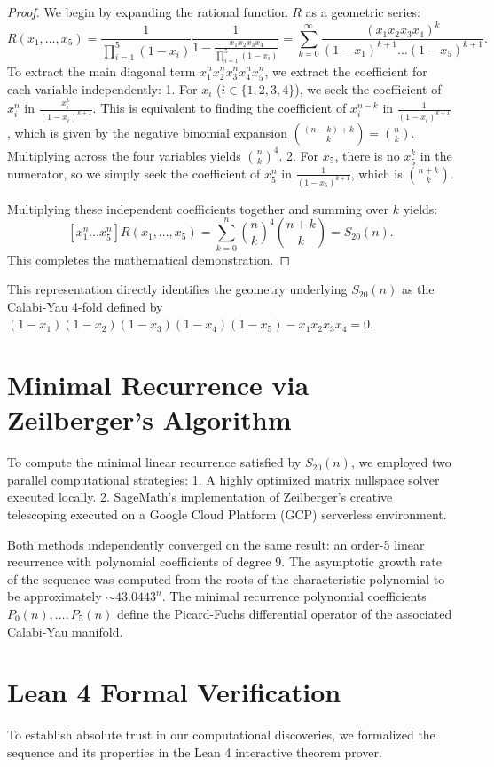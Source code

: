 \documentclass[11pt, a4paper]{article}
\begin{document}
\begin{proof}
We begin by expanding the rational function $R$ as a geometric series:
\[
R(x_1, \dots, x_5) = \frac{1}{\prod_{i=1}^5 (1-x_i)} \frac{1}{1 - \frac{x_1 x_2 x_3 x_4}{\prod_{i=1}^5 (1-x_i)}} = \sum_{k=0}^\infty \frac{(x_1 x_2 x_3 x_4)^k}{(1-x_1)^{k+1} \dots (1-x_5)^{k+1}}.
\]
To extract the main diagonal term $x_1^n x_2^n x_3^n x_4^n x_5^n$, we extract the coefficient for each variable independently:
1. For $x_i$ ($i \in \{1,2,3,4\}$), we seek the coefficient of $x_i^n$ in $\frac{x_i^k}{(1-x_i)^{k+1}}$. This is equivalent to finding the coefficient of $x_i^{n-k}$ in $\frac{1}{(1-x_i)^{k+1}}$, which is given by the negative binomial expansion $\binom{(n-k)+k}{k} = \binom{n}{k}$. Multiplying across the four variables yields $\binom{n}{k}^4$.
2. For $x_5$, there is no $x_5^k$ in the numerator, so we simply seek the coefficient of $x_5^n$ in $\frac{1}{(1-x_5)^{k+1}}$, which is $\binom{n+k}{k}$.

Multiplying these independent coefficients together and summing over $k$ yields:
\[
[x_1^n \dots x_5^n] R(x_1, \dots, x_5) = \sum_{k=0}^n \binom{n}{k}^4 \binom{n+k}{k} = S_{20}(n).
\]
This completes the mathematical demonstration.
\end{proof}
This representation directly identifies the geometry underlying $S_{20}(n)$ as the Calabi-Yau 4-fold defined by $(1-x_1)(1-x_2)(1-x_3)(1-x_4)(1-x_5) - x_1 x_2 x_3 x_4 = 0$.

\section{Minimal Recurrence via Zeilberger's Algorithm}
To compute the minimal linear recurrence satisfied by $S_{20}(n)$, we employed two parallel computational strategies:
1. A highly optimized matrix nullspace solver executed locally.
2. SageMath's implementation of Zeilberger's creative telescoping executed on a Google Cloud Platform (GCP) serverless environment.

Both methods independently converged on the same result: an order-5 linear recurrence with polynomial coefficients of degree 9. The asymptotic growth rate of the sequence was computed from the roots of the characteristic polynomial to be approximately $\sim 43.0443^n$. The minimal recurrence polynomial coefficients $P_0(n), \dots, P_5(n)$ define the Picard-Fuchs differential operator of the associated Calabi-Yau manifold.

\section{Lean 4 Formal Verification}
To establish absolute trust in our computational discoveries, we formalized the sequence and its properties in the Lean 4 interactive theorem prover. 
\end{document}

